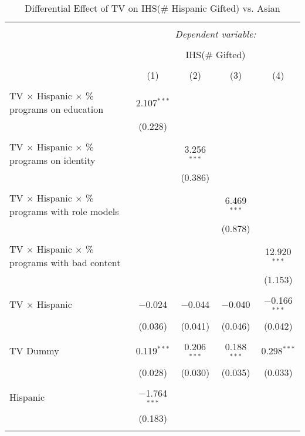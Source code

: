 
\begin{table}[!htbp] \centering 
  \caption{Differential Effect of TV on IHS(\# Hispanic Gifted) vs. Asian} 
  \label{} 
\begin{tabular}{@{\extracolsep{-2pt}}lcccc} 
\\[-1.8ex]\hline 
\hline \\[-1.8ex] 
 & \multicolumn{4}{c}{\textit{Dependent variable:}} \\ 
\cline{2-5} 
\\[-1.8ex] & \multicolumn{4}{c}{IHS(\# Gifted)} \\ 
\\[-1.8ex] & (1) & (2) & (3) & (4)\\ 
\hline \\[-1.8ex] 
 TV $\times$ Hispanic $\times$ \% programs on education & 2.107$^{***}$ &  &  &  \\ 
  & (0.228) &  &  &  \\ 
  & & & & \\ 
 TV $\times$ Hispanic $\times$ \% programs on identity &  & 3.256$^{***}$ &  &  \\ 
  &  & (0.386) &  &  \\ 
  & & & & \\ 
 TV $\times$ Hispanic $\times$ \% programs with role models &  &  & 6.469$^{***}$ &  \\ 
  &  &  & (0.878) &  \\ 
  & & & & \\ 
 TV $\times$ Hispanic $\times$ \% programs with bad content &  &  &  & 12.920$^{***}$ \\ 
  &  &  &  & (1.153) \\ 
  & & & & \\ 
 TV $\times$ Hispanic & $-$0.024 & $-$0.044 & $-$0.040 & $-$0.166$^{***}$ \\ 
  & (0.036) & (0.041) & (0.046) & (0.042) \\ 
  & & & & \\ 
 TV Dummy & 0.119$^{***}$ & 0.206$^{***}$ & 0.188$^{***}$ & 0.298$^{***}$ \\ 
  & (0.028) & (0.030) & (0.035) & (0.033) \\ 
  & & & & \\ 
 Hispanic & $-$1.764$^{***}$ &  &  &  \\ 
  & (0.183) &  &  &  \\ 
  & & & & \\ 

\end{tabular}
\end{table}
